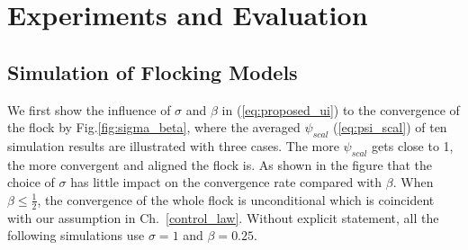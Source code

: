 \chapter{Experiments and Evaluation}\label{experiment}

\section{Simulation of Flocking Models}

We first show the influence of $\sigma$ and $\beta$ in (\ref{eq:proposed_ui}) to the convergence of the flock by Fig.\ref{fig:sigma_beta}, where the averaged $\psi_{scal}$ (\ref{eq:psi_scal}) of ten simulation results are illustrated with three cases. The more $\psi_{scal}$ gets close to 1, the more convergent and aligned the flock is. As shown in the figure that the choice of $\sigma$ has little impact on the convergence rate compared with $\beta$. When $\beta\leq\frac{1}{2}$, the convergence of the whole flock is unconditional which is coincident with our assumption in Ch.~\ref{control_law}. Without explicit statement, all the following simulations use $\sigma=1$ and $\beta=0.25$.

